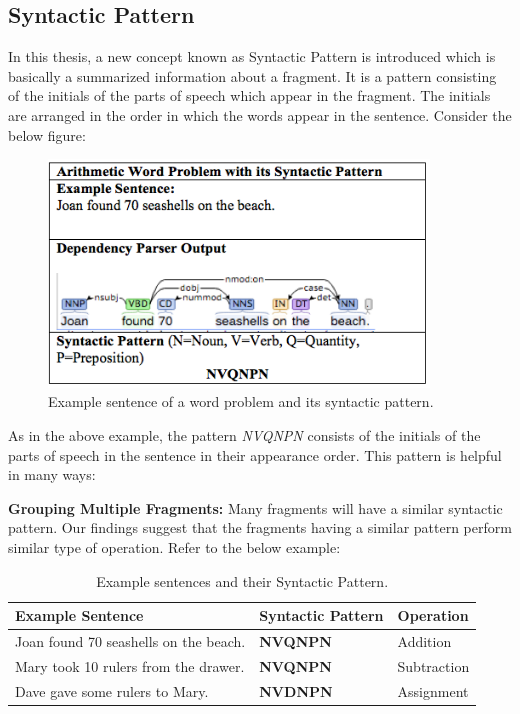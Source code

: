 \documentclass[11pt]{article}
\begin{document}
\subsection{Syntactic Pattern}
In this thesis, a new concept known as Syntactic Pattern is introduced which is basically a summarized information about a fragment. It is a pattern consisting of the initials of the parts of speech which appear in the fragment. The initials are arranged in the order in which the words appear in the sentence. Consider the below figure:

\begin{figure}[h!]
\includegraphics[width=0.9\textwidth]{Figure1}
\centering
\caption{\label{fig:Figure1}Example sentence of a word problem and its syntactic pattern.}
\end{figure}

As in the above example, the pattern \textit{NVQNPN} consists of the initials of the parts of speech in the sentence in their appearance order. This pattern is helpful in many ways:

\textbf{Grouping Multiple Fragments:} Many fragments will have a similar syntactic pattern. Our findings suggest that the fragments having a similar pattern perform similar type of operation. Refer to the below example:

\begin{table}[h!]
\centering
\begin{tabular}{ | m{16em} | m{6em} | m{6em} |}
\hline
\textbf{Example Sentence} & \textbf{Syntactic Pattern} & \textbf{Operation}\\
\hline
Joan found 70 seashells on the beach. & \textbf{NVQNPN} & Addition \\
\hline
Mary took 10 rulers from the drawer. & \textbf{NVQNPN} & Subtraction\\
\hline
Dave gave some rulers to Mary. & \textbf{NVDNPN} & Assignment\\
\hline
\end{tabular}
\caption{Example sentences and their Syntactic Pattern.}
\label{table:14}
\end{table}
 
\end{document}
